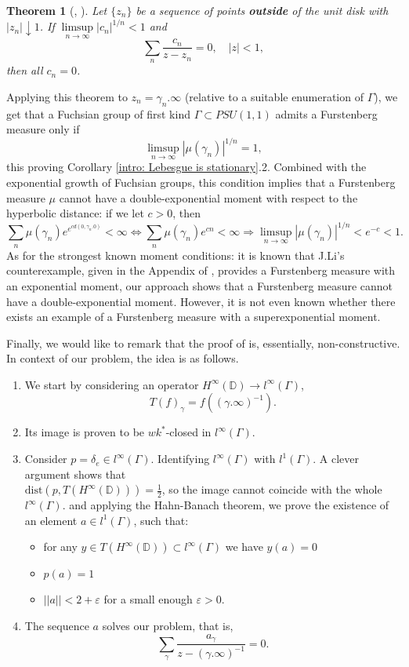 \documentclass[11pt]{article}
\newtheorem{theorem}{Theorem}[section]
\begin{document}
\begin{theorem}[\cite{beurling1934fonctions}, \cite{beurling1989collected}]
	Let $\{ z_n \}$ be a sequence of points \textbf{outside} of the unit disk with $|z_n| \downarrow 1$. If $\limsup\limits_{n \rightarrow \infty} |c_n|^{1/n} < 1$ and
	\[
	\sum_n \frac{c_n}{z - z_n} = 0, \quad |z| < 1,
	\]
	then all $c_n = 0$.
\end{theorem}
Applying this theorem to $z_n = \gamma_n.\infty$ (relative to a suitable enumeration of $\Gamma$), we get that a Fuchsian group of first kind $\Gamma \subset PSU(1,1)$ admits a Furstenberg measure only if
\[
\limsup\limits_{n \rightarrow \infty} |\mu(\gamma_n)|^{1/n} = 1,
\] 
this proving Corollary \ref{intro: Lebesgue is stationary}.2. Combined with the exponential growth of Fuchsian groups, this condition implies that a Furstenberg measure $\mu$ cannot have a double-exponential moment with respect to the hyperbolic distance: if we let $c > 0$, then
\[
\sum_{n} \mu(\gamma_n) e^{e^{c d(0, \gamma_n.0)}} < \infty \iff \sum_{n} \mu(\gamma_n) e^{c n} < \infty \Rightarrow \limsup\limits_{n \rightarrow \infty} |\mu(\gamma_n)|^{1/n} < e^{-c} < 1.
\]
As for the strongest known moment conditions: it is known that J.Li's counterexample, given in the Appendix of \cite{10.1215/00127094-2020-0058}, provides a Furstenberg measure with an exponential moment, our approach shows that a Furstenberg measure cannot have a double-exponential moment. However, it is not even known whether there exists an example of a Furstenberg measure with a superexponential moment. 

Finally, we would like to remark that the proof of \cite[Theorem 3]{brownsums} is, essentially, non-constructive. In context of our problem, the idea is as follows.

\begin{enumerate}
	\item We start by considering an operator $H^\infty(\mathbb{D}) \rightarrow l^\infty(\Gamma)$, 
	\[
	T(f)_\gamma = f((\gamma.\infty)^{-1}).
	\]
	\item Its image is proven to be $wk^*$-closed in $l^\infty(\Gamma)$.
	\item Consider $p = \delta_{e} \in l^\infty(\Gamma)$. Identifying $l^\infty(\Gamma)$ with $l^1(\Gamma)$. A clever argument shows that \\ $\text{dist}(p, T(H^\infty(\mathbb{D}))) = \frac{1}{2}$, so the image cannot coincide with the whole $l^\infty(\Gamma)$. and applying the Hahn-Banach theorem, we prove the existence of an element $a \in l^1(\Gamma)$, such that:
	\begin{itemize}
		\item for any $y \in T(H^\infty(\mathbb{D})) \subset l^\infty(\Gamma)$ we have $y(a) = 0$
		\item $p(a) = 1$
		\item $||a|| < 2 + \varepsilon$ for a small enough $\varepsilon > 0$.
	\end{itemize}
	\item The sequence $a$ solves our problem, that is,
	\[
	\sum_{\gamma} \dfrac{a_\gamma}{z - (\gamma.\infty)^{-1}} = 0.
	\]
\end{enumerate}
\end{document}
